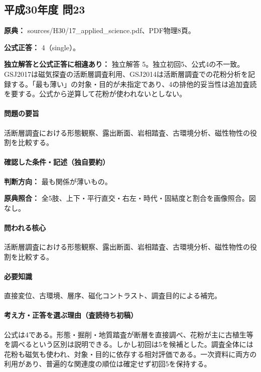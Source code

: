 \subsection{平成30年度 問23}
\label{q:h30-reg-applied-23}

\noindent\textbf{原典：} sources/H30/17\_applied\_science.pdf、PDF物理8頁。

\textbf{公式正答：} 4（single）。

\par\textbf{独立解答と公式正答に相違あり：} 独立解答 5。独立初回5、公式4の不一致。GSJ2017は磁気探査の活断層調査利用、GSJ2014は活断層調査での花粉分析を記録する。「最も薄い」の対象・目的が未指定であり、4の排他的妥当性は追加査読を要する。公式から逆算して花粉が使われないとしない。

\paragraph{問題の要旨} 活断層調査における形態観察、露出断面、岩相踏査、古環境分析、磁性物性の役割を比較する。

\paragraph{確認した条件・記述（独自要約）}\mbox{}\par

\noindent\textbf{判断方向：} 最も関係が薄いもの。\par

\noindent\textbf{原典照合：} 全5肢、上下・平行直交・右左・時代・固結度と割合を画像照合。図なし。\par

\paragraph{問われる核心} 活断層調査における形態観察、露出断面、岩相踏査、古環境分析、磁性物性の役割を比較する。

\paragraph{必要知識} 直接変位、古環境、層序、磁化コントラスト、調査目的による補完。

\paragraph{考え方・正答を選ぶ理由（査読待ち初稿）} 公式は4である。形態・掘削・地質踏査が断層を直接調べ、花粉が主に古植生等を調べるという区別は説明できる。しかし初回は5を候補とした。調査全体には花粉も磁気も使われ、対象・目的に依存する相対評価である。一次資料に両方の利用があり、普遍的な関連度の順位は確定せず初回5を保持する。

